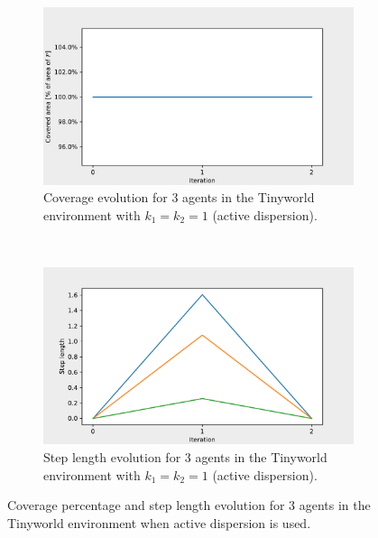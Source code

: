 \begin{figure}[H]
  \centering
  \begin{subfigure}[t]{0.5\textwidth}
    \centering
    \includegraphics[width=\textwidth]{figs/tinyworld_3_agnt_k_1_1_k_2_1_area_traj.pdf}
    \caption{Coverage evolution for 3 agents in the Tinyworld environment with $k_{1} = k_{2} = 1$ (active dispersion).}
    \label{fig:3_agnt_tw_k_1_k_2_1_a_traj}
  \end{subfigure}%
  ~ 
  \begin{subfigure}[t]{0.5\textwidth}
    \centering
    \includegraphics[width=\textwidth]{figs/tinyworld_3_agnt_k_1_1_k_2_1_step_traj.pdf}
    \caption{Step length evolution for 3 agents in the Tinyworld environment with $k_{1} = k_{2} = 1$ (active dispersion).}
    \label{fig:3_agnt_tw_k_1_k_2_1_s_traj}
  \end{subfigure}
  \caption{Coverage percentage and step length evolution for 3 agents in the Tinyworld environment when active dispersion is used.}
  \label{fig:3_agnt_tw_evolution_active}
\end{figure}